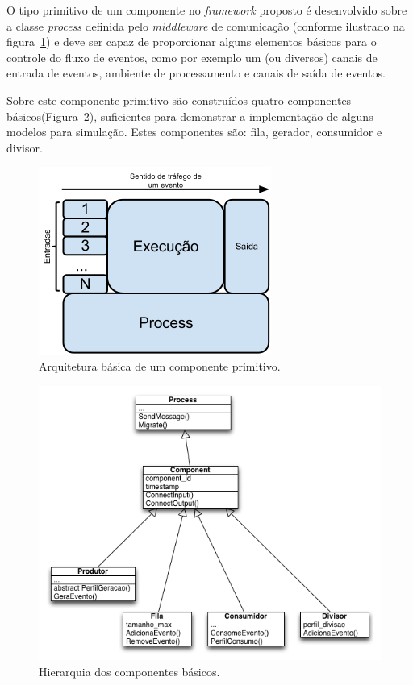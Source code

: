 O tipo primitivo de um componente no \textit{framework} proposto é desenvolvido sobre a classe \textit{process} definida pelo \textit{middleware} de comunicação (conforme ilustrado na figura~\ref{fig:basic_component}) e deve ser capaz de proporcionar alguns elementos básicos para o controle do fluxo de eventos, como por exemplo um (ou diversos) canais de entrada de eventos, ambiente de processamento e canais de saída de eventos.

Sobre este componente primitivo são construídos quatro componentes básicos(Figura~\ref{fig:uml_components}), suficientes para demonstrar a implementação de alguns modelos para simulação. Estes componentes são: fila, gerador, consumidor e divisor.

\begin{figure}
  \centerline{\includegraphics{basic_component.png}}
  \caption{Arquitetura básica de um componente primitivo.}
\label{fig:basic_component}
\end{figure}

\begin{figure}
  \centerline{\includegraphics{uml_componentes.png}}
  \caption{Hierarquia dos componentes básicos.}
\label{fig:uml_components}
\end{figure}


